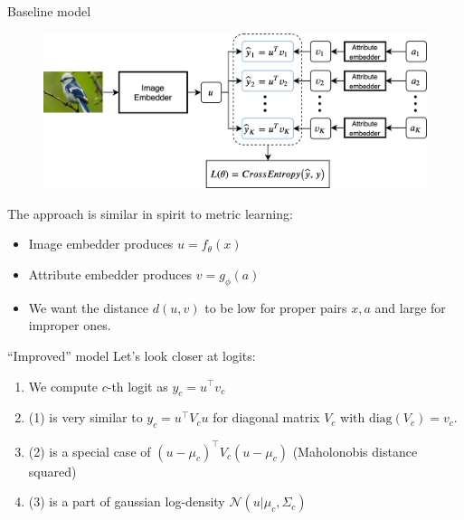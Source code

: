 \documentclass[handout, 10pt]{beamer}
\begin{document}
\begin{frame}{Baseline model}
    \begin{figure}
        \centering
        \includegraphics[width=\textwidth]{images/model-overview}
    \end{figure}
    
    \pause The approach is similar in spirit to metric learning:
    \begin{itemize}
        \item\pause Image embedder produces $u = f_\theta(x)$
        \item\pause Attribute embedder produces $v = g_\phi(a)$
        \item\pause We want the distance $d(u,v)$ to be low for proper pairs $x,a$ and large for improper ones.
    \end{itemize}
\end{frame}


\begin{frame}{``Improved'' model}
Let's look closer at logits:

\begin{enumerate}
    \item\pause We compute $c$-th logit as $y_c = u^\top v_c$
    \item\pause (1) is very similar to $y_c = u^\top V_c u$ for diagonal matrix $V_c$ with $\text{diag}(V_c) = v_c$.
    \item\pause (2) is a special case of $(u - \mu_c)^\top V_c (u - \mu_c)$ (Maholonobis distance squared)
    \item\pause (3) is a part of gaussian log-density $\mathcal{N}(u|\mu_c, \Sigma_c)$
\end{enumerate}
\end{frame}
\end{document}
